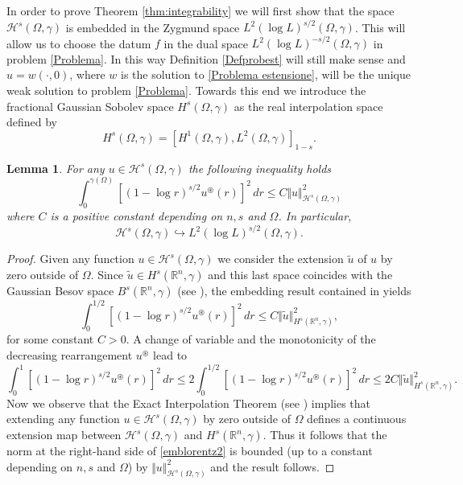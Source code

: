 \documentclass[a4paper,10pt,reqno]{amsart}
\newtheorem{lemma}[theorem]{Lemma}
\numberwithin{equation}{section}
\begin{document}
In order to prove Theorem \ref{thm:integrability} we will first show that the space $\mathcal{H}^{s}(\Omega,\gamma)$ is embedded in the Zygmund space $L^2(\log L)^{s/2}(\Omega,\gamma)$. This will allow us to choose the datum
$f$ in the dual space $L^2(\log L)^{-s/2}(\Omega,\gamma)$ in problem \eqref{Problema}. In this way
Definition \ref{Defprobest}
will still make sense and $u=w(\cdot,0)$, where $w$ is the solution to
\eqref{Problema estensione}, will be the unique weak solution to problem
\eqref{Problema}. Towards this end we introduce the fractional Gaussian Sobolev space $H^{s}(\Omega,\gamma)$ as the real interpolation space defined by
\[
H^{s}(\Omega,\gamma)=\left[  H^{1}(\Omega,\gamma),L^{2}(\Omega
,\gamma)\right]  _{1-s}.
\]

\begin{lemma}
For any $u\in\mathcal{H}^{s}(\Omega,\gamma)$ the following inequality holds
\begin{equation}
\int_{0}^{\gamma(\Omega)}[(1-  \log r)^{s/2}u^{\circledast}(r)]^{2}\,dr\leq C\Vert u\Vert_{\mathcal{H}^{s}(\Omega
,\gamma)}^2 \label{emblorentz}%
\end{equation}
where $C$ is a positive constant depending on $n,s$ and $\Omega$. In particular,
\[
\mathcal{H}^{s}(\Omega,\gamma)\hookrightarrow L^{2}(\log L)^{s/2}(\Omega,\gamma).
\]
\end{lemma}

\begin{proof}
Given any function $u\in\mathcal{H}^{s}(\Omega,\gamma)$ we consider the
extension $\widetilde{u}$ of $u$ by zero outside of $\Omega$. Since $\widetilde
{u}\in H^{s}(\mathbb{R}^{n},\gamma)$ and this last space
coincides with the Gaussian Besov space $B^{s}(\mathbb{R}^{n},\gamma)$ (see
\cite{Nikitin}), the embedding result contained in \cite[Theorem 23]{MaMi} yields
\begin{equation*}
 \int_{0}^{1/2}[(1-  \log r)^{s/2}u^{\circledast}(r)]^{2}\,dr\leq
 C\Vert\widetilde{u}\Vert^{2}_{H^{s}(\mathbb{R}^{n},\gamma)},
\end{equation*}
for some constant $C>0$. A change of variable and the monotonicity of the decreasing rearrangement $u^{\circledast}$ lead to
\begin{equation}
\int_{0}^{1}[(1-  \log r)^{s/2}u^{\circledast}(r)]^{2}\,dr
\leq 2 \int_{0}^{1/2}[(1-  \log r)^{s/2}u^{\circledast}(r)]^{2}\,dr
\leq 2C\Vert\widetilde{u}\Vert^{2}_{H^{s}(\mathbb{R}^{n},\gamma)}.\label{emblorentz2}
\end{equation}
Now we observe that the Exact Interpolation Theorem (see \cite[Theorem 7.23]{AdamsFourn}) implies that
extending any function $u\in\mathcal{H}^{s}(\Omega,\gamma)$ by zero
outside of $\Omega$ defines a continuous extension map between $\mathcal{H}^{s}%
(\Omega,\gamma)$ and $H^{s}(\mathbb{R}^{n},\gamma)$. Thus it follows that the norm at the right-hand side of
\eqref{emblorentz2} is bounded (up to a constant depending on $n,s$ and $\Omega$) by $\Vert u\Vert_{\mathcal{H}^{s}(\Omega,\gamma)}^2$ and the result follows.
\end{proof}
\end{document}
